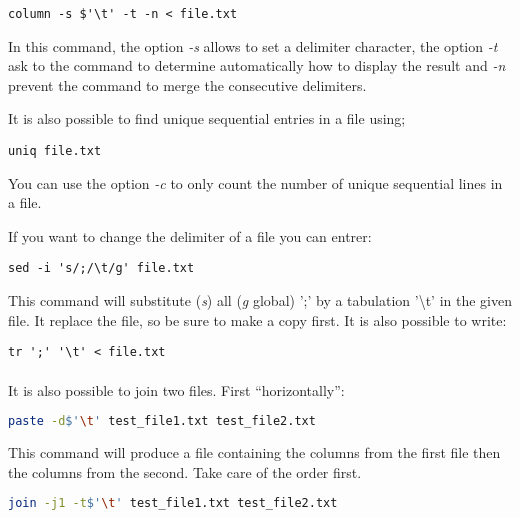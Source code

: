 \documentclass[two_sides]{my_article}
\begin{document}
\begin{lstlisting}[frame=lines, numbers=none]
column -s $'\t' -t -n < file.txt
\end{lstlisting}

In this command, the option \emph{-s} allows to set a delimiter character, the option \emph{-t} ask to the command to determine automatically how to display the result and \emph{-n} prevent the command to merge the consecutive delimiters.

It is also possible to find unique sequential entries in a file using;

\begin{lstlisting}[frame=lines, numbers=none]
uniq file.txt
\end{lstlisting}

You can use the option \emph{-c} to only count the number of unique sequential lines in a file.

If you want to change the delimiter of a file you can entrer:

\begin{lstlisting}[frame=lines, numbers=none]
sed -i 's/;/\t/g' file.txt
\end{lstlisting}

This command will substitute (\emph{s}) all (\emph{g} global) ';' by a tabulation '\textbackslash t' in the given file. It replace the file, so be sure to make a copy first. It is also possible to write:

\begin{lstlisting}[frame=lines, numbers=none]
tr ';' '\t' < file.txt
\end{lstlisting}

\paragraph{}
It is also possible to join two files. First ``horizontally'':

\begin{lstlisting}[frame=lines, numbers=none, language=bash]
paste -d$'\t' test_file1.txt test_file2.txt
\end{lstlisting}

This command will produce a file containing the columns from the first file then the columns from the second. Take care of the order first.

\begin{lstlisting}[frame=lines, numbers=none, language=bash]
join -j1 -t$'\t' test_file1.txt test_file2.txt
\end{lstlisting}
\end{document}

